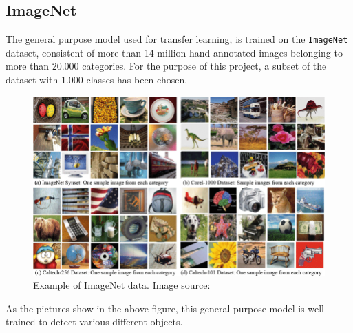 \subsection{ImageNet} \label{sec:ImageNet}
The general purpose model used for transfer learning, is trained on the \texttt{ImageNet}\autocite{imagenet_cvpr09} dataset, consistent of more than 14 million hand annotated images belonging to more than 20.000 categories. For the purpose of this project, a subset of the dataset with 1.000 classes has been chosen.
\begin{figure}[H]
    \centering
    \includegraphics[scale=0.3]{pictures/random/imagenet}
    \caption{Example of ImageNet data. Image source: \autocite{imagenetex}}
    \label{fig:imagenetdata}
\end{figure}
As the pictures show in the above figure, this general purpose model is well trained to detect various different objects.
